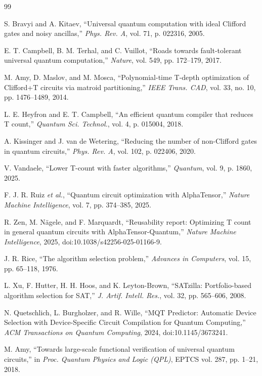 \documentclass{cbctq}
\begin{document}
\begin{thebibliography}{99}

S. Bravyi and A. Kitaev,
``Universal quantum computation with ideal Clifford gates and noisy ancillas,''
\textit{Phys. Rev. A}, vol. 71, p. 022316, 2005.

E. T. Campbell, B. M. Terhal, and C. Vuillot,
``Roads towards fault-tolerant universal quantum computation,''
\textit{Nature}, vol. 549, pp. 172--179, 2017.

M. Amy, D. Maslov, and M. Mosca,
``Polynomial-time T-depth optimization of Clifford+T circuits via matroid partitioning,''
\textit{IEEE Trans. CAD}, vol. 33, no. 10, pp. 1476--1489, 2014.

L. E. Heyfron and E. T. Campbell,
``An efficient quantum compiler that reduces T count,''
\textit{Quantum Sci. Technol.}, vol. 4, p. 015004, 2018.

A. Kissinger and J. van de Wetering,
``Reducing the number of non-Clifford gates in quantum circuits,''
\textit{Phys. Rev. A}, vol. 102, p. 022406, 2020.

V. Vandaele,
``Lower T-count with faster algorithms,''
\textit{Quantum}, vol. 9, p. 1860, 2025.

F. J. R. Ruiz \textit{et al.},
``Quantum circuit optimization with AlphaTensor,''
\textit{Nature Machine Intelligence}, vol. 7, pp. 374--385, 2025.

R. Zen, M. N\"agele, and F. Marquardt,
``Reusability report: Optimizing T count in general quantum circuits with AlphaTensor-Quantum,''
\textit{Nature Machine Intelligence}, 2025,
doi:10.1038/s42256-025-01166-9.

J. R. Rice,
``The algorithm selection problem,''
\textit{Advances in Computers}, vol. 15, pp. 65--118, 1976.

L. Xu, F. Hutter, H. H. Hoos, and K. Leyton-Brown,
``SATzilla: Portfolio-based algorithm selection for SAT,''
\textit{J. Artif. Intell. Res.}, vol. 32, pp. 565--606, 2008.

N. Quetschlich, L. Burgholzer, and R. Wille,
``MQT Predictor: Automatic Device Selection with Device-Specific Circuit Compilation for Quantum Computing,''
\textit{ACM Transactions on Quantum Computing}, 2024,
doi:10.1145/3673241.

M. Amy,
``Towards large-scale functional verification of universal quantum circuits,''
in \textit{Proc. Quantum Physics and Logic (QPL)}, EPTCS vol. 287, pp. 1--21, 2018.

\end{thebibliography}
\end{document}
